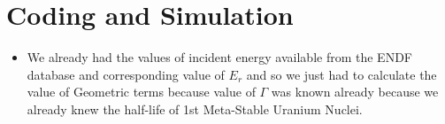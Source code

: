 \documentclass{article}
\begin{document}
\section{Coding and Simulation}
\begin{itemize}
\item We already had the values of incident energy available from the ENDF database and corresponding value of $E_r$ and so we just had to calculate the value of Geometric terms because value of $\Gamma$ was known already because we already knew the half-life of 1st Meta-Stable Uranium Nuclei.
\end{itemize}
\end{document}
